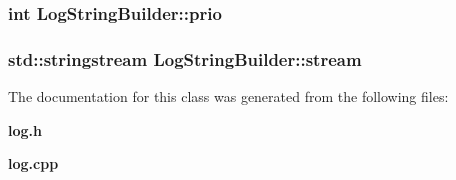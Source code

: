 \subsubsection{\setlength{\rightskip}{0pt plus 5cm}int {\bf Log\-String\-Builder::prio}\hspace{0.3cm}{\tt  [private]}}\label{classLogStringBuilder_89d48a7590de117fec0b40c0babbaee5}


\subsubsection{\setlength{\rightskip}{0pt plus 5cm}std::stringstream {\bf Log\-String\-Builder::stream}\hspace{0.3cm}{\tt  [private]}}\label{classLogStringBuilder_405447561d3d7337cc093dad6c6d81b5}




The documentation for this class was generated from the following files:\begin{CompactItemize}
\item 
{\bf log.h}\item 
{\bf log.cpp}\end{CompactItemize}
